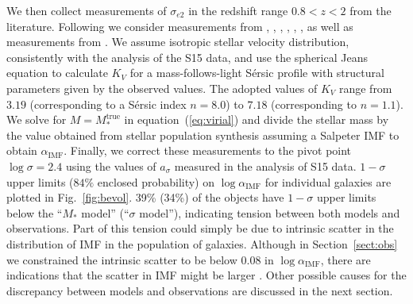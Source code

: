 \documentclass[usenatbib]{mnras}
\def\mtrue{M_*^{\mathrm{true}}}
\def\msalp{M_*^{\mathrm{Salp}}}
\def\aimf{\alpha_{\mathrm{IMF}}}
\def\Sref#1{Section~\ref{#1}\xspace}
\def\Fref#1{Fig.~\ref{#1}\xspace}
\def\Eref#1{equation~(\ref{#1})\xspace}
\begin{document}
We then collect measurements of $\sigma_{e2}$ in the redshift range
$0.8 < z < 2$ from the literature. Following \citet{Mas++15} we
consider measurements from \citet{vdW++08}, \citet{Cap++09},
\citet{New++10}, \citet{Ono++12}, \citet{Bez++13}, \citet{vdS++13}, as
well as measurements from \citet{Gar++15}.  We assume isotropic
  stellar velocity distribution, consistently with the analysis of the
  S15 data, and use the spherical Jeans equation to calculate $K_V$
  for a mass-follows-light S\'{e}rsic \citep{Ser68} profile with structural parameters
  given by the observed values. 
The adopted values of $K_V$ range from $3.19$ (corresponding to a S\'{e}rsic index $n=8.0$) to $7.18$ (corresponding to $n=1.1$).
We
solve for $M=\mtrue$ in \Eref{eq:virial} and divide the stellar mass
by the value obtained from stellar population synthesis assuming a
Salpeter IMF to obtain $\aimf$.  
Finally, we correct these
measurements to the pivot point %
$\log{\sigma}=2.4$ using the values of $a_\sigma$ measured
in the analysis of S15 data.  $1-\sigma$ upper limits ($84\%$ enclosed
probability) on $\log{\aimf}$ for individual galaxies are plotted in
\Fref{fig:bevol}.  39\% (34\%) of the objects have $1-\sigma$ upper
limits below the ``$M_*$ model'' (``$\sigma$ model''), indicating
tension between both models and observations.  Part of this tension
could simply be due to intrinsic scatter in the distribution of IMF in
the population of galaxies.  Although in \Sref{sect:obs} we
constrained the intrinsic scatter to be below $0.08$ in $\log{\aimf}$,
there are indications that the scatter in IMF might be larger 
\citep{S+L13}. 
Other possible causes for the discrepancy between models and observations are discussed in the next section.
%
\end{document}
